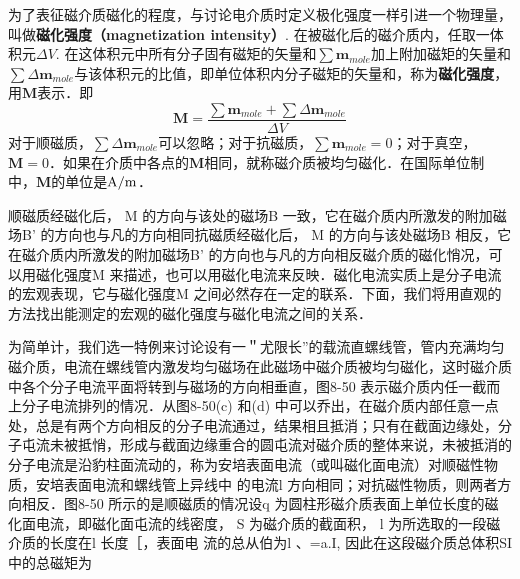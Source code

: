 
为了表征磁介质磁化的程度，与讨论电介质时定义极化强度一样引进一个物理量，叫做\textbf{磁化强度（magnetization intensity）}. 在被磁化后的磁介质内，任取一体积元$\Delta V$. 在这体积元中所有分子固有磁矩的矢量和$\sum \mathbf{m}_{mole}$加上附加磁矩的矢量和$\sum \Delta\mathbf{m}_{mole}$与该体积元的比值，即单位体积内分子磁矩的矢量和，称为\textbf{磁化强度}，用$\mathbf M$表示．即
\begin{equation}
\mathbf M=\frac{\sum \mathbf m_{mole}+\sum \Delta \mathbf m_{mole}}{\Delta V}
\end{equation}
对于顺磁质，$\sum \Delta\mathbf{m}_{mole}$可以忽略；对于抗磁质，$\sum \mathbf{m}_{mole}=0$；对于真空，$\mathbf M=0$．如果在介质中各点的$\mathbf M $相同，就称磁介质被均匀磁化．在国际单位制中，$\mathbf M$的单位是$\rm A/m$．

顺磁质经磁化后， M 的方向与该处的磁场B 一致，它在磁介质内所激发的附加磁场B' 的方向也与凡的方向相同抗磁质经磁化后， M 的方向与该处磁场B 相反，它在磁介质内所激发的附加磁场B' 的方向也与凡的方向相反磁介质的磁化悄况，可以用磁化强度M 来描述，也可以用磁化电流来反映．磁化电流实质上是分子电流的宏观表现，它与磁化强度M 之间必然存在一定的联系．下面，我们将用直观的方法找出能测定的宏观的磁化强度与磁化电流之间的关系．

为简单计，我们选一特例来讨论设有一＂尤限长”的载流直螺线管，管内充满均匀磁介质，电流在螺线管内激发均匀磁场在此磁场中磁介质被均匀磁化，这时磁介质中各个分子电流平面将转到与磁场的方向相垂直，图8-50 表示磁介质内任一截而上分子电流排列的情况．从图8-50(c) 和(d) 中可以乔出，在磁介质内部任意一点处，总是有两个方向相反的分子电流通过，结果相且抵消；只有在截面边缘处，分子屯流未被抵悄，形成与截面边缘重合的圆屯流对磁介质的整体来说，未被抵消的分子电流是沿豹柱面流动的，称为安培表面电流（或叫磁化面电流）对顺磁性物质，安培表面电流和螺线管上异线中
的电流l 方向相同；对抗磁性物质，则两者方向相反．图8-50 所示的是顺磁质的情况设q 为圆柱形磁介质表面上单位长度的磁化面电流，即磁化面屯流的线密度， S 为磁介质的截面积， l 为所选取的一段磁介质的长度在l 长度［，表面电
流的总从伯为l 、=a.I, 因此在这段磁介质总体积SI 中的总磁矩为